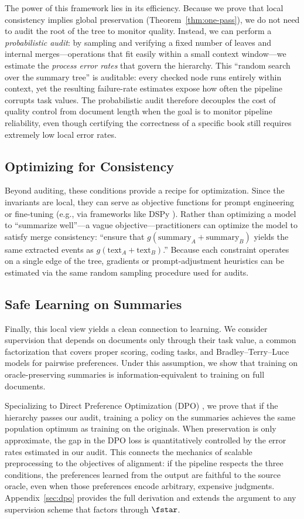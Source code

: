 The power of this framework lies in its efficiency. Because we prove that local consistency implies global preservation (Theorem~\ref{thm:one-pass}), we do not need to audit the root of the tree to monitor quality. Instead, we can perform a \emph{probabilistic audit}: by sampling and verifying a fixed number of leaves and internal merges---operations that fit easily within a small context window---we estimate the \emph{process error rates} that govern the hierarchy. This ``random search over the summary tree'' is auditable: every checked node runs entirely within context, yet the resulting failure-rate estimates expose how often the pipeline corrupts task values. The probabilistic audit therefore decouples the cost of quality control from document length when the goal is to monitor pipeline reliability, even though certifying the correctness of a specific book still requires extremely low local error rates.

\subsection{Optimizing for Consistency}

Beyond auditing, these conditions provide a recipe for optimization. Since the invariants are local, they can serve as objective functions for prompt engineering or fine-tuning (e.g., via frameworks like DSPy \citep{khattab2024dspy}). Rather than optimizing a model to ``summarize well''---a vague objective---practitioners can optimize the model to satisfy merge consistency: ``ensure that $g(\text{summary}_A + \text{summary}_B)$ yields the same extracted events as $g(\text{text}_A + \text{text}_B)$.'' Because each constraint operates on a single edge of the tree, gradients or prompt-adjustment heuristics can be estimated via the same random sampling procedure used for audits.

\subsection{Safe Learning on Summaries}

Finally, this local view yields a clean connection to learning. We consider supervision that depends on documents only through their task value, a common factorization that covers proper scoring, coding tasks, and Bradley--Terry--Luce models for pairwise preferences. Under this assumption, we show that training on oracle-preserving summaries is information-equivalent to training on full documents.

Specializing to Direct Preference Optimization (DPO) \citep{RafailovEtAl2023DPO}, we prove that if the hierarchy passes our audit, training a policy on the summaries achieves the same population optimum as training on the originals. When preservation is only approximate, the gap in the DPO loss is quantitatively controlled by the error rates estimated in our audit. This connects the mechanics of scalable preprocessing to the objectives of alignment: if the pipeline respects the three conditions, the preferences learned from the output are faithful to the source oracle, even when those preferences encode arbitrary, expensive judgments. Appendix~\ref{sec:dpo} provides the full derivation and extends the argument to any supervision scheme that factors through $\fstar$.
